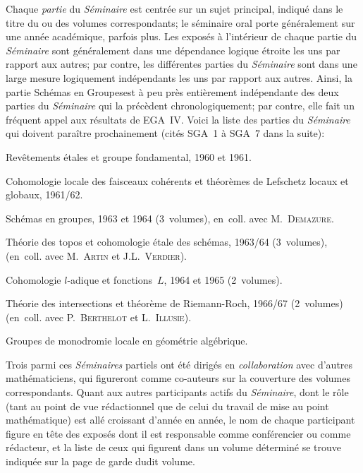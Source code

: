 Chaque \emph{partie} du \emph{Séminaire} est centr\'ee sur un
sujet principal, indiqu\'e dans le titre du ou des volumes
correspondants; le s\'eminaire oral porte g\'en\'eralement sur
une ann\'ee acad\'emique, parfois plus. Les expos\'es \`a
l'int\'erieur de chaque partie du \emph{Séminaire} sont
g\'en\'eralement dans une d\'ependance logique \'etroite les
uns par rapport aux autres; par contre, les diff\'erentes parties du
\emph{Séminaire} sont dans une large mesure logiquement
ind\'ependants les uns par rapport aux autres. Ainsi, la partie
\og Sch\'emas en Groupes\fg est \`a peu pr\`es enti\`erement
ind\'ependante des deux parties du \emph{Séminaire} qui la
pr\'ec\`edent chronologiquement; par contre, elle fait un
fr\'equent appel aux r\'esultats de EGA~IV. Voici la liste des
parties du \emph{Séminaire} qui doivent para\^itre
prochainement (cit\'es SGA~1 \`a SGA~7 dans la suite):
\begin{enumerateb}
\item[SGA 1.] Rev\^etements \'etales et groupe fondamental, 1960
et 1961.
\item[SGA 2.] Cohomologie locale des faisceaux coh\'erents et
th\'eor\`emes de Lefschetz locaux et globaux, 1961/62.
\item[SGA 3.] Sch\'emas en groupes, 1963 et 1964 (3~volumes),
en~coll. avec M.\, \textsc{Demazure}.
\item[SGA 4.] Th\'eorie des topos et cohomologie \'etale des
sch\'emas, 1963/64 (3~volumes), (en~coll. avec M.\, \textsc{Artin} et
J.L.\, \textsc{Verdier}).
\item[SGA 5.] Cohomologie $l$-adique et fonctions~$L$, 1964 et 1965
(2~volumes).
\item[SGA 6.] Th\'eorie des intersections et th\'eor\`eme de
Riemann-Roch, 1966/67 (2~volumes) (en~coll. avec P.\, \textsc{Berthelot} et
L.\, \textsc{Illusie}).
\item[SGA 7.] Groupes de monodromie locale en g\'eom\'etrie
alg\'ebrique.
\end{enumerateb}

Trois parmi ces \emph{Séminaires} partiels ont \'et\'e
dirig\'es en \emph{collaboration} avec d'autres
math\'e\-maticiens, qui figureront comme co-auteurs sur la
couverture des volumes correspondants. Quant aux autres participants
actifs du \emph{Séminaire}, dont le r\^ole (tant au point de vue
r\'edactionnel que de celui du travail de mise au point
math\'ematique) est all\'e croissant d'ann\'ee en ann\'ee, le
nom de chaque participant figure en t\^ete des expos\'es dont il
est responsable comme conf\'erencier ou comme r\'edacteur, et la
liste de ceux qui figurent dans un volume d\'etermin\'e se trouve
indiqu\'ee
sur la page de garde dudit volume.

